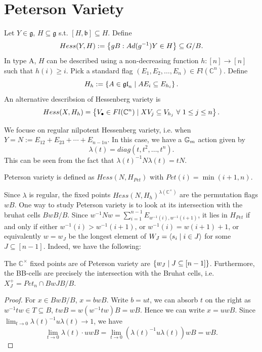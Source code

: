 \section{Peterson Variety}

Let $Y\in \mathfrak{g}$, $H\subseteq \mathfrak{g}$ s.t. $[H,\mathfrak{b}]\subseteq H$. Define
\[
  Hess(Y,H):=\left\{gB:Ad(g^{-1})Y\in H\right\}\subseteq G/B.
\]
In type A, $H$ can be described using a non-decreasing function $h:[n]\rightarrow [n]$ such that $h(i)\geq i$. Pick a standard flag $(E_1,E_2,\dots ,E_n)\in Fl(\mathbb{C}^n)$. Define
\[
  H_h:=\left\{A\in \mathfrak{gl}_n\mid AE_i\subseteq E_{h_i}\right\}.
\]
An alternative describsion of Hessenberg variety is
\[
  Hess(X,H_h) =\CB{V_\bullet\in Fl(\mathbb{C}^n)\mid XV_j\subseteq V_{h_j}\ \forall\ 1\leq j\leq n}.
\]

We focuse on regular nilpotent Hessenberg variety, i.e. when $Y=N:=E_{12}+E_{23}+\cdots +E_{n-1n}$. In this case, we have a ${\mathbb{G}_m}$ action given by
\[
  \lambda(t)=diag(t,t^2,\dots ,t^n).
\]
This can be seen from the fact that $\lambda(t)^{-1}N\lambda(t)=tN$.
\begin{definition}[def:]{}
  Peterson variety is defined as $Hess(N,H_{Pet})$ with $Pet(i)=\min(i+1,n)$.
\end{definition}

Since $\lambda$ is regular, the fixed points $Hess(N,H_h)^{\lambda(\mathbb{C}^\times )}$ are the permutation flags $wB$.
One way to study Peterson variety is to look at its intersection with the bruhat cells $BwB/B$. Since $w^{-1}Nw=\sum_{i=1}^{n-1}E_{w^{-1}(i), w^{-1}(i+1)}$, it lies in $H_{Pet}$ if and only if either $w^{-1}(i)>w^{-1}(i+1)$, or $w^{-1}(i)=w(i+1)+1$, or equivalently $w=w_J$ be the longest element of $W_J=\langle s_i\mid i\in J \rangle$ for some $J\subseteq [n-1]$.
Indeed, we have the following:

\begin{lemma}[lem:]{}
  The $\mathbb{C}^\times $ fixed points are of Peterson variety are $\left\{w_J\mid J\subseteq [n-1]\right\}$. Furthermore, the BB-cells are precisely the intersection with the Bruhat cells, i.e.
  $X_J^+=Pet_n\cap BwJB/B$.
  \begin{proof}
    For $x\in BwB/B$, $x=bwB$. Write $b=ut$, we can absorb $t$ on the right as $w^{-1}tw\in T\subseteq B$, $twB=w(w^{-1}tw)B=wB$. Hence we can write $x=uwB$. Since $\lim_{t\rightarrow 0}\lambda(t)^{-1}u\lambda(t)\rightarrow 1$, we have
    \[
      \lim_{t\rightarrow 0}\lambda(t)\cdot uwB=\lim_{t\rightarrow 0}(\lambda(t)^{-1}u\lambda(t))wB=wB.
    \]
  \end{proof}
\end{lemma}

